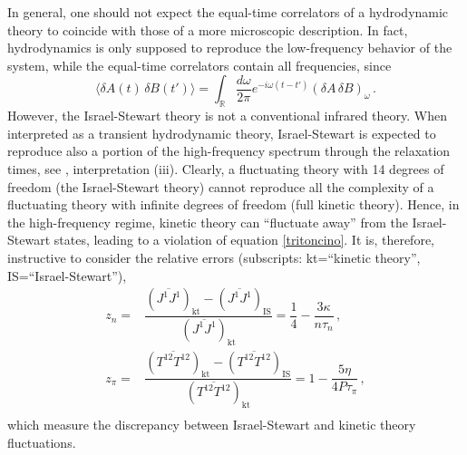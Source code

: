 \documentclass[aps,prd,preprint,nofootinbib,amsmath,amssymb,showpacs,longbibliography,singlecolumn,superscriptaddress,10pt]{revtex4-1}
\theoremstyle{plain}
\theoremstyle{definition}
\begin{document}
In general, one should not expect the equal-time correlators of a hydrodynamic theory to coincide with those of a more microscopic description. In fact, hydrodynamics is only supposed to reproduce the low-frequency behavior of the system, while the equal-time correlators contain all frequencies, since
\begin{equation}
    \langle \delta A(t) \, \delta B(t')\rangle =\int_{\mathbb{R}} \dfrac{d\omega}{2\pi} e^{-i\omega (t-t')}  (\delta A \, \delta B)_\omega \, .
\end{equation}
However, the Israel-Stewart theory is not a conventional infrared theory. When interpreted as a transient hydrodynamic theory, Israel-Stewart is expected to reproduce also a portion of the high-frequency spectrum through the relaxation times, see \cite{Wagner:2023jgq}, interpretation (iii). Clearly, a fluctuating theory with 14 degrees of freedom (the Israel-Stewart theory) cannot reproduce all the complexity of a fluctuating theory with infinite degrees of freedom (full kinetic theory). Hence, in the high-frequency regime, kinetic theory can ``fluctuate away'' from the Israel-Stewart states, leading to a violation of equation \eqref{tritoncino}. It is, therefore, instructive to consider the relative errors (subscripts: kt=``kinetic theory'', IS=``Israel-Stewart''),
\begin{equation}
\begin{split}
    z_n={}& \dfrac{(\overline{J^1J^1})_{\text{kt}}-(\overline{J^1J^1})_{\text{IS}}}{(\overline{J^1J^1})_{\text{kt}}} = \dfrac{1}{4}-\dfrac{3\kappa}{n\tau_n} \, , \\
    z_\pi ={}& \dfrac{(\overline{T^{12}T^{12}})_{\text{kt}}-(\overline{T^{12}T^{12}})_{\text{IS}}}{(\overline{T^{12}T^{12}})_{\text{kt}}} =1-\dfrac{5\eta}{4P\tau_\pi} \, ,\\
\end{split}
\end{equation}
which measure the discrepancy between Israel-Stewart and kinetic theory fluctuations.
\end{document}
